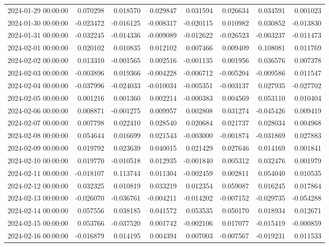 \begin{tabular}{lrrrrrrr}
2024-01-29 00:00:00 & 0.070298 & 0.018570 & 0.029847 & 0.031594 & 0.026634 & 0.034591 & 0.001023 \\
2024-01-30 00:00:00 & -0.023472 & -0.016125 & -0.008317 & -0.020115 & 0.010982 & 0.030852 & -0.013830 \\
2024-01-31 00:00:00 & -0.032245 & -0.014336 & -0.009089 & -0.012622 & -0.026523 & -0.003237 & -0.011473 \\
2024-02-01 00:00:00 & 0.020102 & 0.010835 & 0.012102 & 0.007466 & 0.009409 & 0.108081 & 0.011769 \\
2024-02-02 00:00:00 & 0.013310 & -0.001565 & 0.002516 & -0.001135 & 0.001956 & 0.036576 & 0.007378 \\
2024-02-03 00:00:00 & -0.003896 & 0.019366 & -0.004228 & -0.006712 & -0.005204 & -0.009586 & 0.011547 \\
2024-02-04 00:00:00 & -0.037996 & -0.024033 & -0.010034 & -0.005351 & -0.003137 & 0.027935 & -0.027702 \\
2024-02-05 00:00:00 & 0.001216 & 0.001360 & 0.002214 & -0.000383 & 0.004569 & 0.053110 & 0.010404 \\
2024-02-06 00:00:00 & 0.008871 & -0.001275 & 0.009957 & 0.002808 & 0.031274 & -0.045426 & 0.009419 \\
2024-02-07 00:00:00 & 0.007798 & 0.022410 & 0.028540 & 0.020684 & 0.021737 & 0.028034 & 0.004968 \\
2024-02-08 00:00:00 & 0.054644 & 0.016699 & 0.021543 & -0.003000 & -0.001874 & -0.031869 & 0.027883 \\
2024-02-09 00:00:00 & 0.019792 & 0.023639 & 0.040015 & 0.021429 & 0.027646 & 0.014169 & 0.001841 \\
2024-02-10 00:00:00 & 0.019770 & -0.010518 & 0.012935 & -0.001840 & 0.005312 & 0.032476 & 0.001979 \\
2024-02-11 00:00:00 & -0.018107 & 0.113744 & 0.011304 & -0.002459 & 0.002811 & 0.054040 & 0.010535 \\
2024-02-12 00:00:00 & 0.032325 & 0.010819 & 0.033219 & 0.012354 & 0.059087 & 0.016245 & 0.017864 \\
2024-02-13 00:00:00 & -0.026070 & -0.036761 & -0.004211 & -0.014202 & -0.007152 & -0.029735 & -0.054288 \\
2024-02-14 00:00:00 & 0.057556 & 0.038185 & 0.041572 & 0.053535 & 0.050170 & 0.018934 & 0.012671 \\
2024-02-15 00:00:00 & 0.053766 & -0.037520 & 0.001742 & -0.002106 & 0.017077 & -0.015419 & -0.000859 \\
2024-02-16 00:00:00 & -0.016879 & 0.014195 & 0.004394 & 0.007003 & -0.007567 & -0.019231 & 0.011533 \\

\end{tabular}
